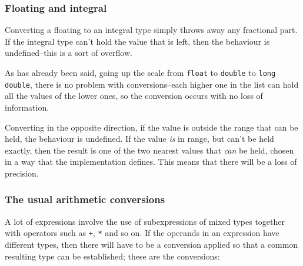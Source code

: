   

   \subsubsection{Floating and integral}
    

    Converting a floating to an integral type simply throws away any
     fractional part. If the integral type can't hold the value that is left,
     then the behaviour is undefined--this is a sort of overflow.


    As has already been said, going up the scale from \texttt{float} to
     \texttt{double} to \texttt{long double}, there is no problem with
     conversions--each higher one in the list can hold all the values of
     the lower ones, so the conversion occurs with no loss of information.


    Converting in the opposite direction, if the value is outside the range
     that can be held, the behaviour is undefined. If the value \textit{is} in
     range, but can't be held exactly, then the result is one of the two
     nearest values that \textit{can} be held, chosen in a way that the
     implementation defines. This means that there will be a loss of
     precision.


   

   \subsubsection{The usual arithmetic conversions}
    

    A lot of expressions involve the use of subexpressions of mixed types
     together with operators such as \texttt{+}, \texttt{*} and
     so on. If the operands in an expression have different types, then there
     will have to be a conversion applied so that a common resulting type can
     be established; these are the conversions:


